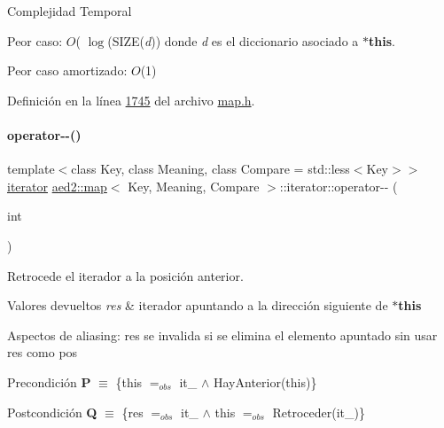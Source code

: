 \begin{DoxyDescription}
\item[Complejidad Temporal]
\begin{DoxyItemize}
\item Peor caso\+: $O$( $\log$(S\+I\+ZE({\itshape d})) donde {\itshape d} es el diccionario asociado a {\bfseries $\ast$this}.
\item Peor caso amortizado\+: $O$(1) 
\end{DoxyItemize}
\end{DoxyDescription}

Definición en la línea \hyperlink{map_8h_source_l01745}{1745} del archivo \hyperlink{map_8h_source}{map.\+h}.

\mbox{\label{classaed2_1_1map_1_1iterator_add45e9ddbb8eeda99326cdb9ac9dd225_add45e9ddbb8eeda99326cdb9ac9dd225}} 
\paragraph{\texorpdfstring{operator-\/-\/()}{operator--()}\hspace{0.1cm}{\footnotesize\ttfamily [2/2]}}
{\footnotesize\ttfamily template$<$class Key, class Meaning, class Compare = std\+::less$<$\+Key$>$$>$ \\
\hyperlink{classaed2_1_1map_1_1iterator}{iterator} \hyperlink{classaed2_1_1map}{aed2\+::map}$<$ Key, Meaning, Compare $>$\+::iterator\+::operator-\/-\/ (\begin{DoxyParamCaption}\item[{int}]{ }\end{DoxyParamCaption})\hspace{0.3cm}{\ttfamily [inline]}}



Retrocede el iterador a la posición anterior. 


\begin{DoxyRetVals}{Valores devueltos}
{\em res} & iterador apuntando a la dirección siguiente de {\bfseries $\ast$this}\\
\hline
\end{DoxyRetVals}
\begin{DoxyParagraph}{Aspectos de aliasing\+:}
res se invalida si se elimina el elemento apuntado sin usar res como pos
\end{DoxyParagraph}
\begin{DoxyPrecond}{Precondición}
{\bfseries P} $\equiv$ \{this $=_{obs}$ it\+\_ $\land$ Hay\+Anterior(this)\} 
\end{DoxyPrecond}
\begin{DoxyPostcond}{Postcondición}
{\bfseries Q} $\equiv$ \{res $=_{obs}$ it\+\_ $\land$ this $=_{obs}$ Retroceder(it\+\_)\}
\end{DoxyPostcond}

